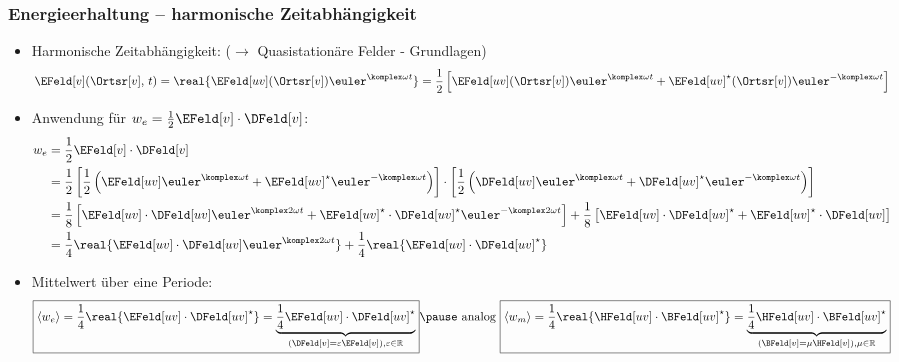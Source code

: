 \begin{frame}
  \frametitle{Energieerhaltung -- harmonische Zeitabhängigkeit}
  \begin{itemize}[<+->]
  \item Harmonische Zeitabhängigkeit: ($\to$ Quasistationäre Felder - Grundlagen)
    $$
    	\EFeld[v](\Ortsr[v],\,t) = \real{\EFeld[uv](\Ortsr[v])  \euler^{\komplex  \omega  t} } = \frac{1}{2} \left[\EFeld[uv](\Ortsr[v])  \euler^{\komplex  \omega  t}  + \EFeld[uv]^\star(\Ortsr[v])  \euler^{-\komplex  \omega  t}  \right] 
        $$
      \item Anwendung für $w_e = \frac{1}{2} \EFeld[v] \cdot \DFeld[v]$:
        \begin{align*}
          w_e &= \frac{1}{2} \EFeld[v] \cdot \DFeld[v] \\
              &= \frac{1}{2} \left[ \frac{1}{2} \left(\EFeld[uv]  \euler^{\komplex  \omega  t}  + \EFeld[uv]^\star  \euler^{-\komplex  \omega  t}  \right)\right] \cdot \left[ \frac{1}{2} \left(\DFeld[uv]  \euler^{\komplex  \omega  t}  + \DFeld[uv]^\star  \euler^{-\komplex  \omega  t}  \right)  \right] \\
              &= \frac{1}{8} \left[ \EFeld[uv] \cdot \DFeld[uv]  \euler^{\komplex  2\omega  t} + \EFeld[uv]^\star \cdot \DFeld[uv]^\star  \euler^{-\komplex  2\omega  t}\right] +  \frac{1}{8} \left[ \EFeld[uv] \cdot \DFeld[uv]^\star  + \EFeld[uv]^\star \cdot \DFeld[uv] \right]\\
          &=\frac{1}{4}\real{\EFeld[uv] \cdot \DFeld[uv]  \euler^{\komplex  2\omega  t}} + \frac{1}{4}\real{\EFeld[uv] \cdot \DFeld[uv]^\star}
        \end{align*}
      \item Mittelwert über eine Periode:
        $$
        \boxed{\langle w_e \rangle = \frac{1}{4}\real{\EFeld[uv] \cdot \DFeld[uv]^\star} = \underbrace{\frac{1}{4}\EFeld[uv] \cdot \DFeld[uv]^\star}_{(\DFeld[v]=\varepsilon\EFeld[v]), \varepsilon\in \mathbb{R}}} \pause\text{ analog } \boxed{\langle w_m \rangle = \frac{1}{4}\real{\HFeld[uv] \cdot \BFeld[uv]^\star} = \underbrace{\frac{1}{4}\HFeld[uv] \cdot \BFeld[uv]^\star}_{(\BFeld[v]=\mu\HFeld[v]), \mu\in \mathbb{R}}}
        $$
  \end{itemize}
\end{frame}

